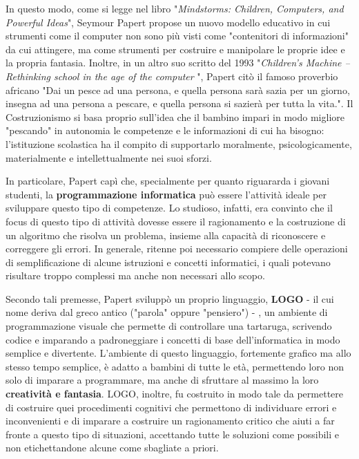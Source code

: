 In questo modo, come si legge nel libro "\textit{Mindstorms: Children, Computers, and Powerful Ideas}", Seymour Papert propose un nuovo modello educativo in cui strumenti come il computer non sono più visti come "contenitori di informazioni" da cui attingere, ma come strumenti per costruire e manipolare le proprie idee e la propria fantasia.
Inoltre, in un altro suo scritto del 1993 "\textit{Children's Machine – Rethinking school in the age of the computer }", Papert citò il famoso proverbio africano "Dai un pesce ad una persona, e quella persona sarà sazia per un giorno,
insegna ad una persona a pescare, e quella persona si sazierà per tutta la vita.". Il Costruzionismo si basa proprio sull'idea che il bambino impari in modo migliore "pescando" in autonomia le competenze e le informazioni di cui
ha bisogno: l'istituzione scolastica ha il compito di supportarlo moralmente, psicologicamente, materialmente e intellettualmente nei suoi sforzi. 

In particolare, Papert capì che, specialmente per quanto riguararda i giovani studenti, la \textbf{programmazione informatica} può essere l'attività ideale per sviluppare questo tipo
di competenze. Lo studioso, infatti, era convinto che il focus di questo tipo di attività dovesse essere il ragionamento e la costruzione di un algoritmo che risolva
un problema, insieme alla capacità di riconoscere e correggere gli errori. In generale, ritenne poi necessario compiere delle operazioni di semplificazione di alcune istruzioni e concetti informatici, i quali potevano risultare troppo complessi
ma anche non necessari allo scopo. 

Secondo tali premesse, Papert sviluppò un proprio linguaggio, \textbf{LOGO} - il cui nome deriva dal greco antico %
("parola" oppure "pensiero") - , un ambiente di programmazione visuale che permette di controllare una tartaruga, scrivendo
codice e imparando a padroneggiare i concetti di base dell'informatica in modo semplice e divertente. L'ambiente di questo linguaggio, fortemente grafico ma allo stesso tempo semplice, 
è adatto a bambini di tutte le età, permettendo loro non solo di imparare a programmare, ma anche di sfruttare al massimo la loro \textbf{creatività e fantasia}.
LOGO, inoltre, fu costruito in modo tale da permettere di costruire quei procedimenti cognitivi che permettono di individuare errori e inconvenienti e di imparare a costruire un ragionamento 
critico che aiuti a far fronte a questo tipo di situazioni, accettando tutte le soluzioni come possibili e non etichettandone alcune come sbagliate a priori.


